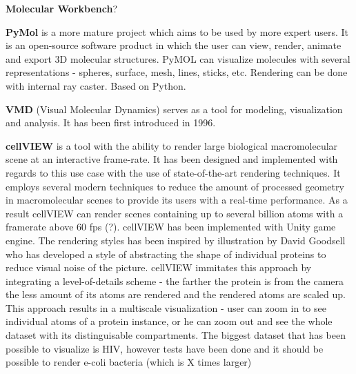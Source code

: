 \documentclass[
  digital, %
  table,   %
  nolof,     %
  nolot,     %
]{fithesis3}
\begin{document}
\textbf{Molecular Workbench}?

\textbf{PyMol} is a more mature project which aims to be used by more expert users. It is an open-source software product in which the user can view, render, animate and export 3D molecular structures. PyMOL can visualize molecules with several representations - spheres, surface, mesh, lines, sticks, etc. Rendering can be done with internal ray caster. Based on Python.

\textbf{VMD} (Visual Molecular Dynamics) serves as a tool for modeling, visualization and analysis. It has been first introduced in 1996.

\textbf{cellVIEW} is a tool with the ability to render large biological macromolecular scene at an interactive frame-rate. It has been designed and implemented with regards to this use case with the use of state-of-the-art rendering techniques. It employs several modern techniques to reduce the amount of processed geometry in macromolecular scenes to provide its users with a real-time performance. As a result cellVIEW can render scenes containing up to several billion atoms with a framerate above 60 fps (?). cellVIEW has been implemented with Unity game engine. The rendering styles has been inspired by illustration by David Goodsell who has developed a style of abstracting the shape of individual proteins to reduce visual noise of the picture. cellVIEW immitates this approach by integrating a level-of-details scheme - the farther the protein is from the camera the less amount of its atoms are rendered and the rendered atoms are scaled up. This approach results in a multiscale visualization - user can zoom in to see individual atoms of a protein instance, or he can zoom out and see the whole dataset with its distinguisable compartments. The biggest dataset that has been possible to visualize is HIV, however tests have been done and it should be possible to render e-coli bacteria (which is X times larger)
\end{document}

